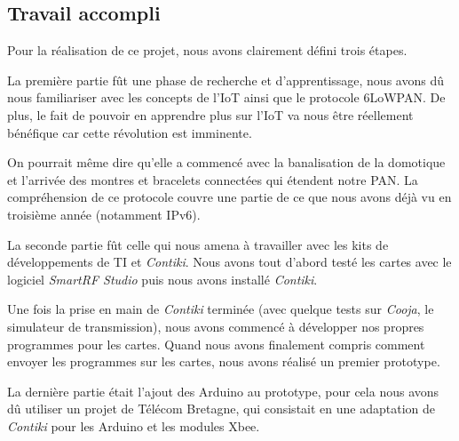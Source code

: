 
\subsection{Travail accompli}

Pour la réalisation de ce projet, nous avons clairement défini trois étapes.

La première partie fût une phase de recherche et d'apprentissage, nous avons dû nous familiariser avec les concepts de l'IoT ainsi que le protocole 6LoWPAN.
De plus, le fait de pouvoir en apprendre plus sur l'IoT va nous être réellement bénéfique car cette révolution est imminente.

On pourrait même dire qu’elle a commencé avec la banalisation de la domotique et l'arrivée des montres et bracelets connectées qui étendent notre PAN.
La compréhension de ce protocole couvre une partie de ce que nous avons déjà vu en troisième année (notamment IPv6).

La seconde partie fût celle qui nous amena à travailler avec les kits de développements de TI et \textit{Contiki}. Nous avons tout d'abord testé les cartes avec le logiciel \textit{SmartRF Studio} puis nous avons installé \textit{Contiki}.

Une fois la prise en main de \textit{Contiki} terminée (avec quelque tests sur \textit{Cooja}, le simulateur de transmission), nous avons commencé à développer nos propres programmes pour les cartes. Quand nous avons finalement compris comment envoyer les programmes sur les cartes, nous avons réalisé un premier prototype.

La dernière partie était l'ajout des Arduino au prototype, pour cela nous avons dû utiliser un projet de Télécom Bretagne, qui consistait en une adaptation de \textit{Contiki} pour les Arduino et les modules Xbee.
